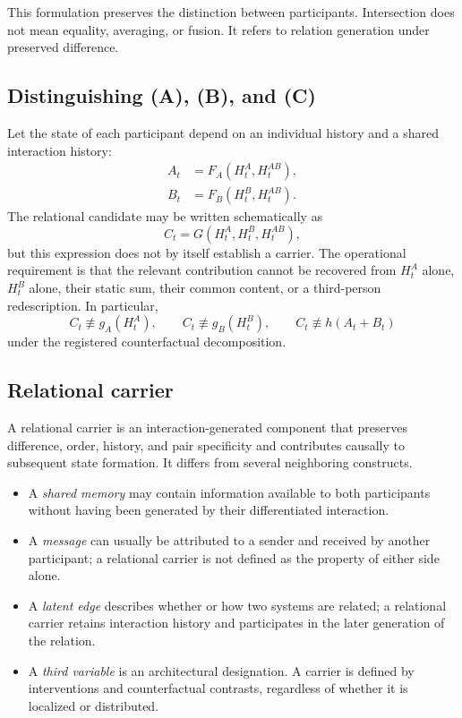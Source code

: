 \documentclass[11pt,a4paper]{article}
\begin{document}
This formulation preserves the distinction between participants. Intersection does not mean equality, averaging, or fusion. It refers to relation generation under preserved difference.

\subsection{Distinguishing (A), (B), and (C)}

Let the state of each participant depend on an individual history and a shared interaction history:
\begin{align}
 A_t &= F_A(H^A_t,H^{AB}_t),\\
 B_t &= F_B(H^B_t,H^{AB}_t).
\end{align}
The relational candidate may be written schematically as
\begin{equation}
  C_t = G(H^A_t,H^B_t,H^{AB}_t),
\end{equation}
but this expression does not by itself establish a carrier. The operational requirement is that the relevant contribution cannot be recovered from $H^A_t$ alone, $H^B_t$ alone, their static sum, their common content, or a third-person redescription. In particular,
\begin{equation}
 C_t \not\equiv g_A(H^A_t), \qquad
 C_t \not\equiv g_B(H^B_t), \qquad
 C_t \not\equiv h(A_t+B_t)
\end{equation}
under the registered counterfactual decomposition.

\subsection{Relational carrier}

A relational carrier is an interaction-generated component that preserves difference, order, history, and pair specificity and contributes causally to subsequent state formation. It differs from several neighboring constructs.

\begin{itemize}
  \item A \emph{shared memory} may contain information available to both participants without having been generated by their differentiated interaction.
  \item A \emph{message} can usually be attributed to a sender and received by another participant; a relational carrier is not defined as the property of either side alone.
  \item A \emph{latent edge} describes whether or how two systems are related; a relational carrier retains interaction history and participates in the later generation of the relation.
  \item A \emph{third variable} is an architectural designation. A carrier is defined by interventions and counterfactual contrasts, regardless of whether it is localized or distributed.
\end{itemize}
\end{document}
